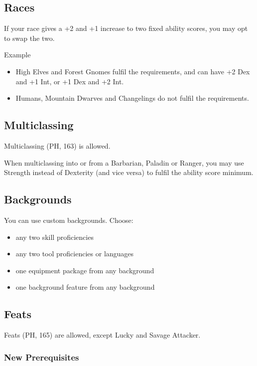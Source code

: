 \documentclass[letterpaper,twocolumn,openany,nodeprecatedcode]{dndbook}
\begin{document}
\subsection{Races}
If your race gives a +2 and +1 increase to two fixed ability scores, you may opt to swap the two.

\begin{DndComment}{Example}
\begin{itemize}
\item High Elves and Forest Gnomes fulfil the requirements, and can have +2 Dex and +1 Int, or +1 Dex and +2 Int.
\item Humans, Mountain Dwarves and Changelings do not fulfil the requirements.
\end{itemize}

\end{DndComment}

\subsection{Multiclassing}
Multiclassing (PH, 163) is allowed. 

When multiclassing into or from a Barbarian, Paladin or Ranger, you may use Strength instead of Dexterity (and vice versa) to fulfil the ability score minimum. 

\subsection{Backgrounds}
You can use custom backgrounds. Choose:
\begin{itemize}
\item any two skill proficiencies 
\item any two tool proficiencies or languages 
\item one equipment package from any background
\item one background feature from any background
\end{itemize}

\subsection{Feats}
Feats (PH, 165) are allowed, except Lucky and Savage Attacker.

\subsubsection{New Prerequisites}
\end{document}
